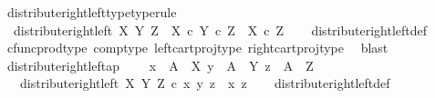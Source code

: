 \begin{isabellebody}
\isanewline
{}\isamarkupfalse%
\ distribute{\isacharunderscore}{\kern0pt}right{\isacharunderscore}{\kern0pt}left{\isacharunderscore}{\kern0pt}type{\isacharbrackleft}{\kern0pt}type{\isacharunderscore}{\kern0pt}rule{\isacharbrackright}{\kern0pt}{\isacharcolon}{\kern0pt}\isanewline
\ \ {\isachardoublequoteopen}distribute{\isacharunderscore}{\kern0pt}right{\isacharunderscore}{\kern0pt}left\ X\ Y\ Z\ {\isacharcolon}{\kern0pt}\ {\isacharparenleft}{\kern0pt}X\ {\isasymtimes}\isactrlsub c\ Y{\isacharparenright}{\kern0pt}\ {\isasymtimes}\isactrlsub c\ Z\ {\isasymrightarrow}\ X\ {\isasymtimes}\isactrlsub c\ Z{\isachardoublequoteclose}\isanewline
%
\isadelimproof
\ \ %
\endisadelimproof
%
\isatagproof
{}\isamarkupfalse%
\ distribute{\isacharunderscore}{\kern0pt}right{\isacharunderscore}{\kern0pt}left{\isacharunderscore}{\kern0pt}def\isanewline
\ \ \isamarkupfalse%
\ cfunc{\isacharunderscore}{\kern0pt}prod{\isacharunderscore}{\kern0pt}type\ comp{\isacharunderscore}{\kern0pt}type\ left{\isacharunderscore}{\kern0pt}cart{\isacharunderscore}{\kern0pt}proj{\isacharunderscore}{\kern0pt}type\ right{\isacharunderscore}{\kern0pt}cart{\isacharunderscore}{\kern0pt}proj{\isacharunderscore}{\kern0pt}type\ \isamarkupfalse%
\ blast%
\endisatagproof
{\isafoldproof}%
%
\isadelimproof
\isanewline
%
\endisadelimproof
\isanewline
{}\isamarkupfalse%
\ distribute{\isacharunderscore}{\kern0pt}right{\isacharunderscore}{\kern0pt}left{\isacharunderscore}{\kern0pt}ap{\isacharcolon}{\kern0pt}\ \isanewline
\ \ \ {\isachardoublequoteopen}x\ {\isacharcolon}{\kern0pt}\ A\ {\isasymrightarrow}\ X{\isachardoublequoteclose}\ {\isachardoublequoteopen}y\ {\isacharcolon}{\kern0pt}\ A\ {\isasymrightarrow}\ Y{\isachardoublequoteclose}\ {\isachardoublequoteopen}z\ {\isacharcolon}{\kern0pt}\ A\ {\isasymrightarrow}\ Z{\isachardoublequoteclose}\isanewline
\ \ \ {\isachardoublequoteopen}distribute{\isacharunderscore}{\kern0pt}right{\isacharunderscore}{\kern0pt}left\ X\ Y\ Z\ {\isasymcirc}\isactrlsub c\ {\isasymlangle}{\isasymlangle}x{\isacharcomma}{\kern0pt}\ y{\isasymrangle}{\isacharcomma}{\kern0pt}\ z{\isasymrangle}\ {\isacharequal}{\kern0pt}\ {\isasymlangle}x{\isacharcomma}{\kern0pt}\ z{\isasymrangle}{\isachardoublequoteclose}\isanewline
%
\isadelimproof
\ \ %
\endisadelimproof
%
\isatagproof
{}\isamarkupfalse%
\ distribute{\isacharunderscore}{\kern0pt}right{\isacharunderscore}{\kern0pt}left{\isacharunderscore}{\kern0pt}def\ \isanewline
\ \ \isamarkupfalse%

\end{isabellebody}
